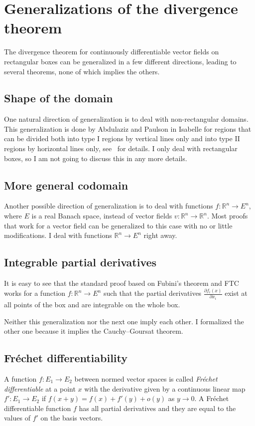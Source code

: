 \documentclass[a4paper, UKenglish,cleveref, autoref, thm-restate]{lipics-v2021}
\newcommand{\bbR}{\mathbb{R}}
\begin{document}
\section{Generalizations of the divergence theorem}%
\label{sec:gener-diverg-theor}

The divergence theorem for continuously differentiable vector fields
on rectangular boxes can be generalized in a few different directions,
leading to several theorems, none of which implies the others.

\subsection{Shape of the domain}
One natural direction of generalization is to deal with
non-rectangular domains. This generalization is done by Abdulaziz and
Paulson in Isabelle for regions that can be divided both into type I
regions by vertical lines only and into type II regions by horizontal
lines only, see~\cite{Abdulaziz_Paulson} for details. I only deal with
rectangular boxes, so I am not going to discuss this in any more
details.


\subsection{More general codomain}
Another possible direction of generalization is to deal with functions
\(f\colon \bbR^{n}\to E^{n}\), where \(E\) is a real Banach space,
instead of vector fields \(v\colon \bbR^{n}\to\bbR^{n}\).  Most proofs
that work for a vector field can be generalized to this case with no
or little modifications. I deal with functions \(\bbR^{n}\to E^{n}\)
right away.

\subsection{Integrable partial derivatives}
It is easy to see that the standard proof based on Fubini's theorem and
FTC works for a function \(f\colon \bbR^{n}\to E^{n}\) such that the
partial derivatives \(\frac{\partial f_{i}(x)}{\partial x_{i}}\) exist
at all points of the box and are integrable on the whole box.

Neither this generalization nor the next one imply each other. I
formalized the other one because it implies the Cauchy--Goursat theorem.

\subsection{Fréchet differentiability}
A function \(f\colon E_{1}\to E_{2}\) between normed vector spaces is
called \emph{Fréchet differentiable} at a point \(x\) with the
derivative given by a continuous linear map
\(f'\colon E_{1}\to E_{2}\) if \(f(x+y)=f(x)+f'(y)+o(y)\) as
\(y\to 0\). A Fréchet differentiable function \(f\) has all partial
derivatives and they are equal to the values of \(f'\) on the basis
vectors.
\end{document}
